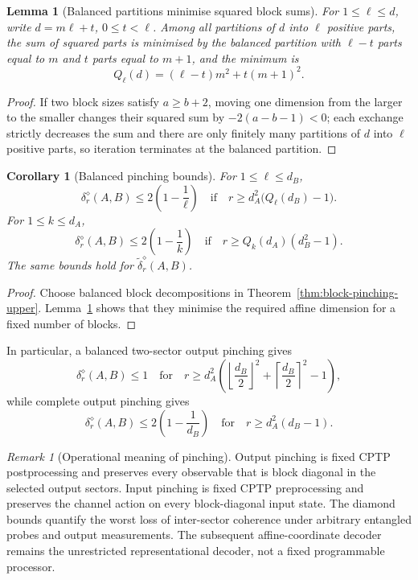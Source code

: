 \documentclass[11pt,a4paper]{article}
\theoremstyle{definition}
\theoremstyle{plain}
\newtheorem{lemma}[theorem]{Lemma}
\newtheorem{corollary}[theorem]{Corollary}
\theoremstyle{remark}
\newtheorem{remark}[theorem]{Remark}
\begin{document}
\begin{lemma}[Balanced partitions minimise squared block sums]
\label{lem:balanced-channel}
For $1\leq\ell\leq d$, write $d=m\ell+t$, $0\leq t<\ell$. Among all
partitions of $d$ into $\ell$ positive parts, the sum of squared parts is
minimised by the balanced partition with $\ell-t$ parts equal to $m$ and
$t$ parts equal to $m+1$, and the minimum is
\[
Q_\ell(d)=(\ell-t)m^2+t(m+1)^2.
\]
\end{lemma}

\begin{proof}
If two block sizes satisfy $a\ge b+2$, moving one dimension from the
larger to the smaller changes their squared sum by $-2(a-b-1)<0$; each
exchange strictly decreases the sum and there are only finitely many
partitions of $d$ into $\ell$ positive parts, so iteration terminates at
the balanced partition.
\end{proof}

\begin{corollary}[Balanced pinching bounds]
\label{cor:balanced-pinching-upper}
For $1\leq\ell\leq d_B$,
\[
\delta_r^\diamond(A,B)
\leq2\left(1-\frac1\ell\right)
\quad\text{if}\quad
r\geq d_A^2\bigl(Q_\ell(d_B)-1\bigr).
\]
For $1\leq k\leq d_A$,
\[
\delta_r^\diamond(A,B)
\leq2\left(1-\frac1k\right)
\quad\text{if}\quad
r\geq Q_k(d_A)(d_B^2-1).
\]
The same bounds hold for $\widetilde\delta_r^\diamond(A,B)$.
\end{corollary}

\begin{proof}
Choose balanced block decompositions in
Theorem~\ref{thm:block-pinching-upper}. Lemma~\ref{lem:balanced-channel}
shows that they minimise the required affine dimension for a fixed number
of blocks.
\end{proof}

In particular, a balanced two-sector output pinching gives
\[
\delta_r^\diamond(A,B)\leq1
\quad\text{for}\quad
r\geq d_A^2\left(
\left\lfloor\frac{d_B}{2}\right\rfloor^2+
\left\lceil\frac{d_B}{2}\right\rceil^2-1
\right),
\]
while complete output pinching gives
\[
\delta_r^\diamond(A,B)
\leq2\left(1-\frac1{d_B}\right)
\quad\text{for}\quad
r\geq d_A^2(d_B-1).
\]

\begin{remark}[Operational meaning of pinching]
Output pinching is fixed CPTP postprocessing and preserves every observable
that is block diagonal in the selected output sectors. Input pinching is
fixed CPTP preprocessing and preserves the channel action on every
block-diagonal input state. The diamond bounds quantify the worst loss of
inter-sector coherence under arbitrary entangled probes and output
measurements. The subsequent affine-coordinate decoder remains the
unrestricted representational decoder, not a fixed programmable processor.
\end{remark}
\end{document}
